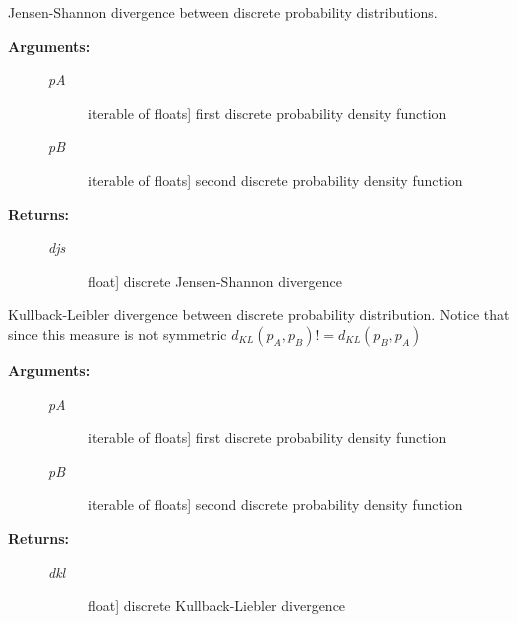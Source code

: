 \documentclass[letterpaper,10pt,english]{sphinxmanual}
\begin{document}
\begin{fulllineitems}
\label{index:encore.similarity.discrete_jensen_shannon_divergence}
Jensen-Shannon divergence between discrete probability distributions.
\begin{description}
\item[{\textbf{Arguments:}}] \leavevmode\begin{description}
\item[{\emph{pA}}] \leavevmode{[}iterable of floats{]}
first discrete probability density function

\item[{\emph{pB}}] \leavevmode{[}iterable of floats{]}
second discrete probability density function

\end{description}

\item[{\textbf{Returns:}}] \leavevmode\begin{description}
\item[{\emph{djs}}] \leavevmode{[}float{]}
discrete Jensen-Shannon divergence

\end{description}

\end{description}

\end{fulllineitems}


\begin{fulllineitems}
\label{index:encore.similarity.discrete_kullback_leibler_divergence}
Kullback-Leibler divergence between discrete probability distribution. Notice that since this measure is not symmetric  \(d_{KL}(p_A,p_B) != d_{KL}(p_B,p_A)\)
\begin{description}
\item[{\textbf{Arguments:}}] \leavevmode\begin{description}
\item[{\emph{pA}}] \leavevmode{[}iterable of floats{]}
first discrete probability density function

\item[{\emph{pB}}] \leavevmode{[}iterable of floats{]}
second discrete probability density function

\end{description}

\item[{\textbf{Returns:}}] \leavevmode\begin{description}
\item[{\emph{dkl}}] \leavevmode{[}float{]}
discrete Kullback-Liebler divergence

\end{description}

\end{description}

\end{fulllineitems}
\end{document}
